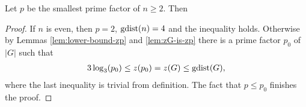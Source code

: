 \begin{thm}
\label{thm:lower-bound}
Let $p$ be the smallest prime factor of $n \geq 2$. Then
%
\end{thm}%
\begin{proof}
If $n$ is even, then $p=2$, $\mathop{\mathrm{gdist}}(n) = 4$ and the inequality holds. Otherwise by Lemmas \ref{lem:lower-bound-zp} and \ref{lem:zG-is-zp} there is a prime factor $p_0$ of $|G|$ such that
\begin{align}
	3 \log_3(p_0) \leq z(p_0) = z(G) \leq \mathop{\mathrm{gdist}}(G),
\end{align}
where the last inequality is trivial from definition. The fact that $p \leq p_0$ finishes the proof.
\end{proof}
